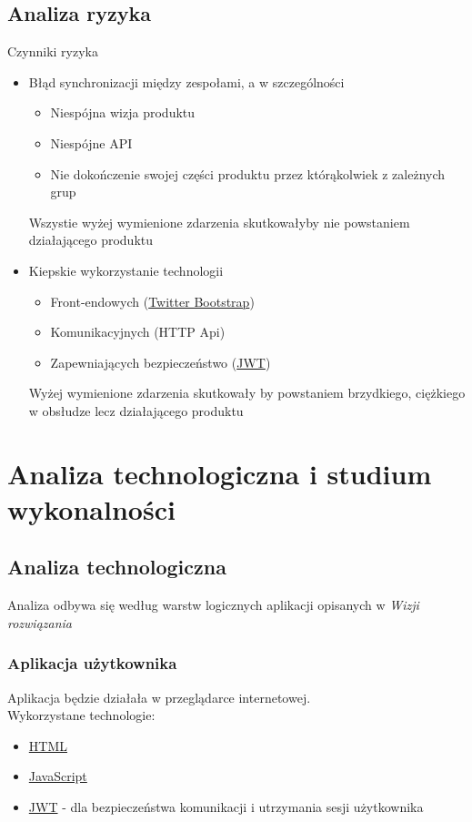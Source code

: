\documentclass[10pt,a4paper]{article}
\begin{document}
\subsection{Analiza ryzyka}
Czynniki ryzyka
\begin{itemize}
  \item Błąd synchronizacji między zespołami, a w szczególności \begin{itemize}
    \item Niespójna wizja produktu
    \item Niespójne API
    \item Nie dokończenie swojej części produktu przez którąkolwiek z zależnych grup
  \end{itemize}
  Wszystie wyżej wymienione zdarzenia skutkowałyby nie powstaniem działającego produktu
  \item Kiepskie wykorzystanie technologii \begin{itemize}
    \item Front-endowych (\href{https://getbootstrap.com/}{Twitter Bootstrap})
    \item Komunikacyjnych (HTTP Api)
    \item Zapewniających bezpieczeństwo (\href{https://jwt.io/}{JWT})
  \end{itemize}
  Wyżej wymienione zdarzenia skutkowały by powstaniem brzydkiego, ciężkiego w obsłudze lecz działającego produktu
\end{itemize}

\section{Analiza technologiczna i studium wykonalności}

\subsection{Analiza technologiczna}
Analiza odbywa się według warstw logicznych aplikacji opisanych w \emph{Wizji rozwiązania}

\subsubsection{Aplikacja użytkownika}
Aplikacja będzie działała w przeglądarce internetowej. \\
Wykorzystane technologie:
\begin{itemize}
  \item \href{https://pl.wikipedia.org/wiki/HTML}{HTML}
  \item \href{https://pl.wikipedia.org/wiki/JavaScript}{JavaScript}
  \item \href{https://jwt.io/}{JWT} - dla bezpieczeństwa komunikacji i utrzymania sesji użytkownika
\end{itemize}
\end{document}

